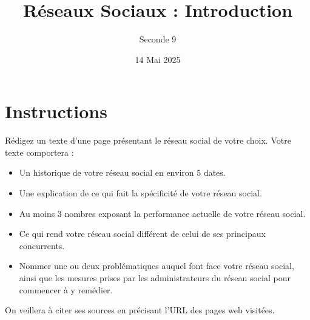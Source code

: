 \documentclass{article}
\title{Réseaux Sociaux : Introduction}
\date{14 Mai 2025}
\author{Seconde 9}
\begin{document}
\maketitle
\section{Instructions}
Rédigez un texte d'une page présentant le réseau social de votre choix. Votre texte comportera :
\begin{itemize}
\item Un historique de votre réseau social en environ 5 dates.
\item Une explication de ce qui fait la spécificité de votre réseau social.
\item Au moins 3 nombres exposant la performance actuelle de votre réseau social.
\item Ce qui rend votre réseau social différent de celui de ses principaux concurrents.
\item Nommer une ou deux problématiques auquel font face votre réseau social, ainsi que les mesures prises par les administrateurs du réseau social pour commencer à y remédier.
\end{itemize}

On veillera à citer ses sources en précisant l'URL des pages web visitées.
\end{document}
